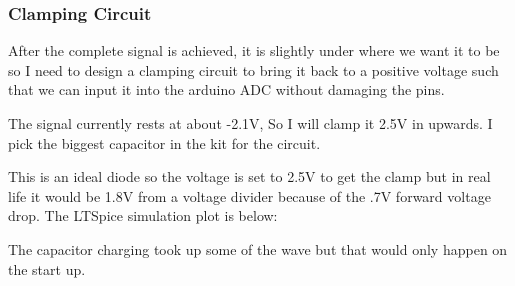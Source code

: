 \documentclass{article}
\begin{document}
\subsubsection{Clamping Circuit}
After the complete signal is achieved, it is slightly under where we want it to be so I need to design a clamping circuit to bring it back to a positive voltage such that we can input it into the arduino ADC without damaging the pins.

The signal currently rests at about -2.1V, So I will clamp it 2.5V in upwards. I pick the biggest capacitor in the kit for the circuit.
\begin{center}
\end{center}
This is an ideal diode so the voltage is set to 2.5V to get the clamp but in real life it would be 1.8V from a voltage divider because of the .7V forward voltage drop. The LTSpice simulation plot is below:
\begin{center}
\end{center}
The capacitor charging took up some of the wave but that would only happen on the start up.
\end{document}
